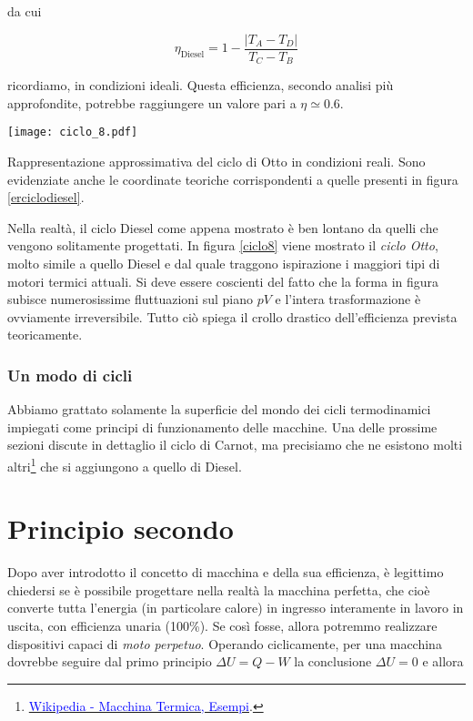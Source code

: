 \noindent da cui

\[ \eta_\text{Diesel} = 1 - \frac{|T_A - T_D|}{T_C - T_B} \]

\noindent ricordiamo, in condizioni ideali. Questa efficienza,
secondo analisi più approfondite, potrebbe raggiungere un
valore pari a $\eta \simeq 0.6$.

\begin{marginfigure}
    \centering
    \texttt{[image: ciclo\_8.pdf]}
    \caption{Rappresentazione approssimativa del ciclo di Otto in
    condizioni reali. Sono evidenziate anche le coordinate teoriche
    corrispondenti a quelle presenti in figura \ref{erciclodiesel}.}
    \label{ciclo8}
\end{marginfigure}

Nella realtà, il ciclo Diesel come appena mostrato è ben lontano
da quelli che vengono solitamente progettati. In figura \ref{ciclo8}
viene mostrato il \textit{ciclo Otto}, molto simile a quello Diesel
e dal quale traggono ispirazione i maggiori tipi di motori termici
attuali. Si deve essere coscienti del fatto che la forma in figura
subisce numerosissime fluttuazioni sul piano $pV$ e l'intera trasformazione
è ovviamente irreversibile. Tutto ciò spiega il crollo drastico
dell'efficienza prevista teoricamente.

\subsubsection*{Un modo di cicli}
Abbiamo grattato solamente la superficie del mondo dei cicli termodinamici
impiegati come principi di funzionamento delle macchine.
Una delle prossime sezioni discute in dettaglio il ciclo di Carnot,
ma precisiamo che ne esistono molti altri\footnote{\href{https://it.wikipedia.org/wiki/Macchina_termica\#Esempi}{\textcolor{blue}{Wikipedia - Macchina Termica, Esempi}}.} %
che si aggiungono a quello di Diesel.




\section{Principio secondo}
Dopo aver introdotto il concetto di macchina e della sua efficienza,
è legittimo chiedersi se è possibile progettare nella realtà
la macchina perfetta, che cioè converte tutta l'energia
(in particolare calore) in ingresso interamente in lavoro in uscita,
con efficienza unaria (100\%). Se così fosse, allora potremmo realizzare dispositivi capaci
di \emph{moto perpetuo}.
Operando ciclicamente, per una macchina dovrebbe seguire dal primo
principio $\Delta U = Q - W$ la conclusione $\Delta U = 0$ e allora

